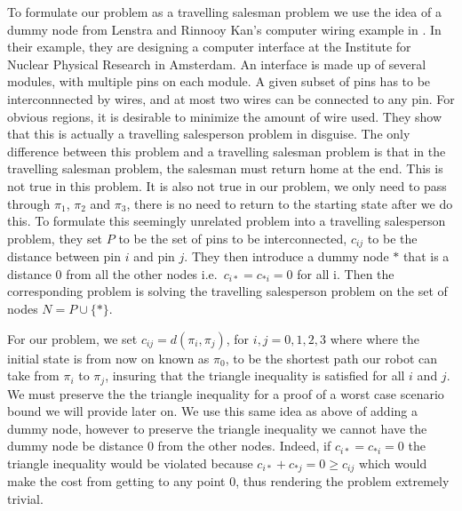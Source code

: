 To formulate our problem as a travelling salesman problem we use the idea of a dummy node from Lenstra and Rinnooy Kan's computer wiring example in \cite{lenstra75}. In their example, they are designing a computer interface at the Institute for Nuclear Physical Research in Amsterdam. An interface is made up of several modules, with multiple pins on each module. A given subset of pins has to be interconnnected by wires, and at most two wires can be connected to any pin. For obvious regions, it is desirable to minimize the amount of wire used. They show that this is actually a travelling salesperson problem in disguise. The only difference between this problem and a travelling salesman problem is that in the travelling salesman problem, the salesman must return home at the end. This is not true in this problem. It is also not true in our problem, we only need to pass through $\pi_1$, $\pi_2$ and $\pi_3$, there is no need to return to the starting state after we do this. To formulate this seemingly unrelated problem into a travelling salesperson problem, they set $P$ to be the set of pins to be interconnected, $c_{ij}$ to be the distance between pin $i$ and pin $j$. They then introduce a dummy node $*$ that is a distance 0 from all the other nodes i.e.\ $c_{i*} = c_{*i} = 0$ for all i. Then the corresponding problem is solving the travelling salesperson problem on the set of nodes $N=P \cup \{*\}$. 

For our problem, we set $c_{ij}=d(\pi_i , \pi_j)$, for $i,j=0,1,2,3$ where where the initial state is from now on known as $\pi_0$, to be the shortest path our robot can take from $\pi_i$ to $\pi_j$, insuring that the triangle inequality is satisfied for all $i$ and $j$. We must preserve the the triangle inequality for a proof of a worst case scenario bound we will provide later on. We use this same idea as above of adding a dummy node, however to preserve the triangle inequality we cannot have the dummy node be distance 0 from the other nodes. Indeed, if $c_{i*} = c_{*i} = 0 $ the triangle inequality would be violated because $c_{i*} + c_{*j} = 0 \geq c_{ij}$ which would make the cost from getting to any point 0, thus rendering the problem extremely trivial. 

